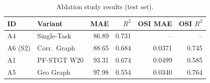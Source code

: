 \begin{table}[!t]
\caption{Ablation study results (test set).}
\label{tab:5}
\centering
\scriptsize
\renewcommand{\arraystretch}{1.15}
\begin{tabular}{|l|l|r|r|r|r|}
\hline
\textbf{ID} & \textbf{Variant} & \textbf{MAE} & \textbf{$R^2$} & \textbf{OSI MAE} & \textbf{OSI $R^2$} \\
\hline
A4 & Single-Task & 86.89 & 0.731 & -- & -- \\
A6 (S2) & Corr.\ Graph & 88.65 & 0.684 & 0.0371 & 0.745 \\
A1 & PF-STGT W20 & 93.31 & 0.674 & 0.0499 & 0.585 \\
A5 & Geo Graph & 97.98 & 0.554 & 0.0340 & 0.764 \\
\hline
\end{tabular}
\end{table}
